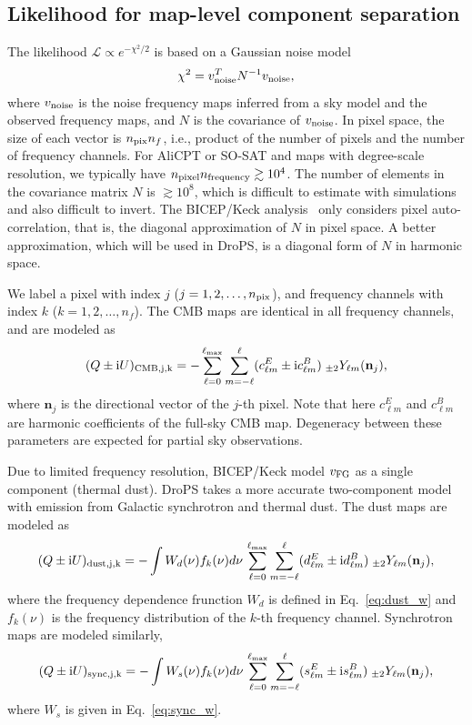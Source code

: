 \documentclass[12pt, a4paper]{ctexart} %
\begin{document}
\subsection{Likelihood for map-level component separation \label{sec:sgld_like}}

The likelihood $\mathcal{L}\propto e^{-\chi^2/2}$ is based on a Gaussian noise model
\begin{equation}
  \chi^2 = v_{\rm noise}^TN^{-1}v_{\rm noise},
\end{equation}
where $v_{\rm noise}$ is the noise frequency maps inferred from a sky model and the observed frequency maps, and $N$ is the covariance of $v_{\rm noise}$. In pixel space, the size of each vector is $n_{\rm pix} n_f$, i.e., product of the number of pixels and the number of frequency channels. For AliCPT or SO-SAT and maps with degree-scale resolution, we typically have $n_{\rm pixel} n_{\rm frequency} \gtrsim 10^4$. The number of elements in the covariance matrix $N$ is $\gtrsim 10^8$, which is difficult to estimate with simulations and also difficult to invert. The BICEP/Keck analysis~\cite{BKmap} only considers pixel auto-correlation, that is, the diagonal approximation of $N$ in pixel space. A better approximation, which will be used in DroPS, is a diagonal form of $N$ in harmonic space.

We label a pixel with index $j$ ($j=1, 2, \ldots, n_{\rm pix}$), and frequency channels with index $k$ ($k = 1, 2, \ldots, n_f$). The CMB maps are identical in all frequency channels, and are modeled as
\begin{equation}
  (Q\pm \mathrm{i}U)_{\rm CMB, j, k} = -\sum_{\ell = 0}^{\ell_{\max}}\sum_{m=-\ell}^\ell (c_{\ell m}^E\pm \mathrm{i} c_{\ell m}^B)\;_{\pm 2}Y_{\ell m}(\mathbf{n}_j), \label{eq:CMB_comp}
\end{equation}
where $\mathbf{n}_j$ is the directional vector of the $j$-th pixel. Note that here $c_{\ell m}^E$ and $c_{\ell m}^B$ are harmonic coefficients of the full-sky CMB map. Degeneracy between these parameters are expected for partial sky observations. 

Due to limited frequency resolution, BICEP/Keck model $v_{\rm FG}$ as a single component (thermal dust). DroPS takes a more accurate two-component model with emission from Galactic synchrotron and thermal dust. The dust maps are modeled as
\begin{equation}
  (Q\pm \mathrm{i}U)_{\rm dust, j, k} =  -\int W_d(\nu) f_k(\nu) d\nu \,\sum_{\ell = 0}^{\ell_{\max}}\sum_{m=-\ell}^\ell (d_{\ell m}^E\pm \mathrm{i}  d_{\ell m}^B)\;_{\pm 2}Y_{\ell m}(\mathbf{n}_j),  \label{eq:dust_comp}
\end{equation}
where the frequency dependence frunction $W_d$ is defined in Eq.~\eqref{eq:dust_w} and $f_k(\nu)$ is the frequency distribution of the $k$-th frequency channel.
Synchrotron maps are modeled similarly,
\begin{equation}
  (Q\pm \mathrm{i}U)_{\rm sync, j, k} =  -\int W_s(\nu) f_k(\nu) d\nu \,\sum_{\ell = 0}^{\ell_{\max}}\sum_{m=-\ell}^\ell (s_{\ell m}^E\pm \mathrm{i}  s_{\ell m}^B)\;_{\pm 2}Y_{\ell m}(\mathbf{n}_j),  \label{eq:sync_comp}
\end{equation}
where $W_s$ is given in Eq.~\eqref{eq:sync_w}.
\end{document}
